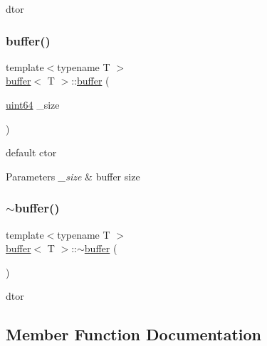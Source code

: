 dtor 

\mbox{\label{structbuffer_aefd0601854f94ec9c18c05986d218c16}} 
\subsubsection{\texorpdfstring{buffer()}{buffer()}\hspace{0.1cm}{\footnotesize\ttfamily [2/2]}}
{\footnotesize\ttfamily template$<$typename T $>$ \\
\hyperlink{structbuffer}{buffer}$<$ T $>$\+::\hyperlink{structbuffer}{buffer} (\begin{DoxyParamCaption}\item[{\hyperlink{types_8h_a60e8696a4678cd348e991a1f172e53f7}{uint64}}]{\+\_\+size }\end{DoxyParamCaption})\hspace{0.3cm}{\ttfamily [inline]}}



default ctor 


\begin{DoxyParams}{Parameters}
{\em \+\_\+size} & buffer size \\
\hline
\end{DoxyParams}
\mbox{\label{structbuffer_accefc959744e463ae78a996a2f45f81a}} 
\subsubsection{\texorpdfstring{$\sim$buffer()}{~buffer()}\hspace{0.1cm}{\footnotesize\ttfamily [2/2]}}
{\footnotesize\ttfamily template$<$typename T $>$ \\
\hyperlink{structbuffer}{buffer}$<$ T $>$\+::$\sim$\hyperlink{structbuffer}{buffer} (\begin{DoxyParamCaption}{ }\end{DoxyParamCaption})\hspace{0.3cm}{\ttfamily [inline]}}



dtor 



\subsection{Member Function Documentation}
\mbox{\label{structbuffer_a877157a0ddb2aa0fa10c7273eece00cb}} 
